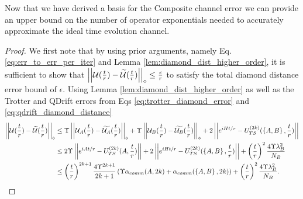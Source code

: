Now that we have derived a basis for the Composite channel error we can provide an upper bound on the number of operator exponentials needed to accurately approximate the ideal time evolution channel. 

\assCost*

\begin{proof}
We first note that by using prior arguments, namely Eq. \eqref{eq:err_to_err_per_iter} and Lemma \ref*{lem:diamond_dist_higher_order}, it is sufficient to show that $\left| \left| \mathcal{U}(\frac{t}{r}) - \widetilde{\mathcal{U}}(\frac{t}{r}) \right| \right|_\diamond \leq \frac{\epsilon}{r}$ to satisfy the total diamond distance error bound of $\epsilon$. Using Lemma \ref{lem:diamond_dist_higher_order} as well as the Trotter and QDrift errors from Eqs \eqref{eq:trotter_diamond_error} and \eqref{eq:qdrift_diamond_distance}
\begin{align}
    \left| \left| \mathcal{U}(\frac{t}{r}) - \widetilde{\mathcal{U}}(\frac{t}{r}) \right| \right|_\diamond &\leq \Upsilon \left| \left|  \mathcal{U}_A(\frac{t}{r}) - \widetilde{\mathcal{U}_A}(\frac{t}{r}) \right| \right|_\diamond + \Upsilon \left| \left| \mathcal{U}_B(\frac{t}{r}) - \widetilde{\mathcal{U}_B}(\frac{t}{r}) \right| \right|_\diamond + 2\left| \left| e^{iHt/r} - {U_{TS}^{( 2k )}}(\left\{ A,B \right\}, \frac{t}{r}) \right| \right|  \\
    &\leq 2 \Upsilon \left| \left| e^{i A t/r} - {U_{TS}^{( 2k )}}(A,\frac{t}{r}) \right| \right| + 2\left| \left| e^{iHt/r} - {U_{TS}^{( 2k )}}(\left\{ A,B \right\}, \frac{t}{r}) \right| \right| + \left( \frac{t}{r} \right)^2 \frac{4 \Upsilon \lambda_B^2}{N_B} \\
    &\leq \left( \frac{t}{r} \right)^{2k+1} \frac{4 \Upsilon^{2k+1}}{2k + 1} \left( \Upsilon \alpha_{comm}(A, 2k) + \alpha_{comm}(\left\{ A,B \right\}, 2k) \right) + \left( \frac{t}{r} \right)^2 \frac{4 \Upsilon \lambda_B^2}{N_B}.
\end{align}


\end{proof}
